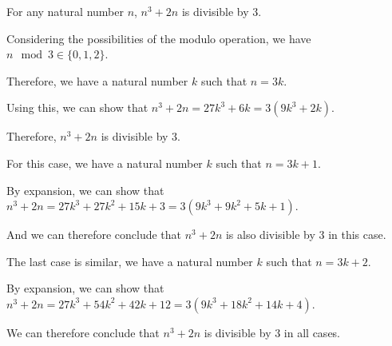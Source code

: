 For any natural number $n$, $n^3 + 2n$ is divisible by $3$.

Considering the possibilities of the modulo operation, we have $n \mod 3 \in \{0, 1, 2\}$.

Therefore, we have a natural number $k$ such that $n = 3k$.

Using this, we can show that $n^3 + 2n = 27k^3 + 6k = 3(9k^3+2k)$.

Therefore, $n^3 + 2n$ is divisible by $3$.

For this case, we have a natural number $k$ such that $n = 3k + 1$.

By expansion, we can show that $n^3 + 2n = 27k^3 + 27k^2 + 15k + 3 = 3(9k^3 + 9k^2 + 5k + 1)$.

And we can therefore conclude that $n^3 + 2n$ is also divisible by $3$ in this case.

The last case is similar, we have a natural number $k$ such that $n = 3k + 2$.

By expansion, we can show that $n^3 + 2n = 27k^3 + 54k^2 + 42k + 12 = 3(9k^3 + 18k^2 + 14k + 4)$.

We can therefore conclude that $n^3 + 2n$ is divisible by $3$ in all cases.